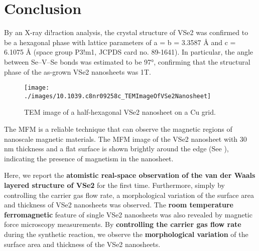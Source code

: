 \section{Conclusion}
By an X-ray di!raction analysis, the crystal structure of VSe2 was confirmed to be a hexagonal phase with lattice parameters of a = b = 3.3587 Å and c = 6.1075 Å (space group P3!m1, JCPDS card no. 89-1641). In particular, the angle between Se–V–Se bonds was estimated to be 97°, confirming that the structural phase of the as-grown VSe2 nanosheets was 1T.
\begin{figure}[ht] 
    \texttt{[image: ./images/10.1039.c8nr09258c\_TEMImageOfVSe2Nanosheet]}
	\caption[TEM image of a half-hexagonal VSe2 nanosheet on a Cu grid]{
		TEM image of a half-hexagonal VSe2 nanosheet on a Cu grid.
	}
\end{figure}

The MFM is a reliable technique that can observe the magnetic regions of nanoscale magnetic materials. The MFM image of the VSe2 nanosheet with 30 nm thickness and a flat surface is shown brightly around the edge (See ), indicating the presence of magnetism in the nanosheet.

Here, we report the \textbf{atomistic real-space observation of the van der Waals layered structure of VSe2} for the first time. Furthermore, simply by controlling the carrier gas flow rate, a morphological variation of the surface area and thickness of VSe2 nanosheets was observed. The \textbf{room temperature ferromagnetic} feature of single VSe2 nanosheets was also revealed by magnetic force microscopy measurements. By \textbf{controlling the carrier gas flow rate} during the synthetic reaction, we observe the \textbf{morphological variation} of the surface area and thickness of the VSe2 nanosheets.


